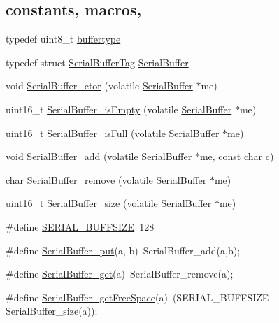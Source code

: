 \subsection*{constants, macros,}
\begin{CompactItemize}
\item 
typedef uint8\_\-t \hyperlink{group__serialbuffer_g034c66ab1e1a09145312b106c2300a8b}{buffertype}
\item 
typedef struct \hyperlink{struct_serial_buffer_tag}{SerialBufferTag} \hyperlink{group__serialbuffer_g36e664fa27ce3c7a3bac11261a96d3fc}{SerialBuffer}
\item 
void \hyperlink{group__serialbuffer_g4e993e27527b5b7362c46ca16fce9854}{SerialBuffer\_\-ctor} (volatile \hyperlink{struct_serial_buffer_tag}{SerialBuffer} $\ast$me)
\item 
uint16\_\-t \hyperlink{group__serialbuffer_g1e7c23fc0a9712d2e3097154c8b85a6f}{SerialBuffer\_\-isEmpty} (volatile \hyperlink{struct_serial_buffer_tag}{SerialBuffer} $\ast$me)
\item 
uint16\_\-t \hyperlink{group__serialbuffer_g522e245db6b26c1b5dc72ec08d84e7d0}{SerialBuffer\_\-isFull} (volatile \hyperlink{struct_serial_buffer_tag}{SerialBuffer} $\ast$me)
\item 
void \hyperlink{group__serialbuffer_g2b16eeee32d0ed95d1beb03252b10933}{SerialBuffer\_\-add} (volatile \hyperlink{struct_serial_buffer_tag}{SerialBuffer} $\ast$me, const char c)
\item 
char \hyperlink{group__serialbuffer_g71d90db4bcb16a30c48d68c8ec1d2df2}{SerialBuffer\_\-remove} (volatile \hyperlink{struct_serial_buffer_tag}{SerialBuffer} $\ast$me)
\item 
uint16\_\-t \hyperlink{group__serialbuffer_g069daa68af8643f07570329943ddfed0}{SerialBuffer\_\-size} (volatile \hyperlink{struct_serial_buffer_tag}{SerialBuffer} $\ast$me)
\item 
\#define \hyperlink{group__serialbuffer_gd47283ecaa82d1fd076f405ba3172fc1}{SERIAL\_\-BUFFSIZE}~128
\item 
\#define \hyperlink{group__serialbuffer_g8c36b7f3380a02dc72bd23604acb63c5}{SerialBuffer\_\-put}(a, b)~SerialBuffer\_\-add(a,b);
\item 
\#define \hyperlink{group__serialbuffer_g557d78acaa759e408254896ba66cbb66}{SerialBuffer\_\-get}(a)~SerialBuffer\_\-remove(a);
\item 
\#define \hyperlink{group__serialbuffer_ge32a6db48ef3832f49f6551fcdfa19d9}{SerialBuffer\_\-getFreeSpace}(a)~(SERIAL\_\-BUFFSIZE-SerialBuffer\_\-size(a));
\end{CompactItemize}


